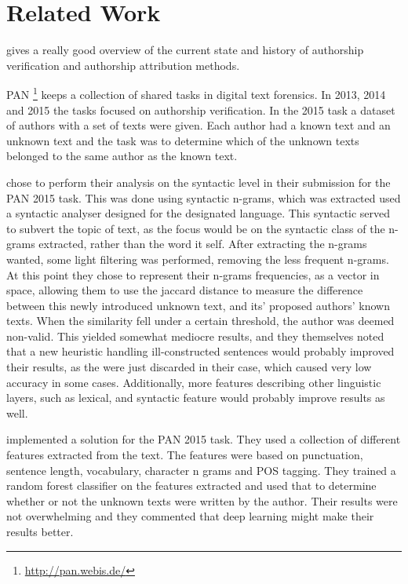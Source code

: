 \section{Related Work}
\cite{stamatos2009} gives a really good overview of the current state and
history of authorship verification and authorship attribution methods.

PAN \footnote{\url{http://pan.webis.de/}} keeps a collection of shared tasks in
digital text forensics. In 2013, 2014 and 2015 the tasks focused on authorship
verification. In the 2015 task a dataset of authors with a set of texts were
given. Each author had a known text and an unknown text and the task was to
determine which of the unknown texts belonged to the same author as the known
text.

\cite{juanpablo2015} chose to perform their analysis on the syntactic level in 
their submission for the PAN 2015 task. This was done using syntactic n-grams,
which was extracted used a syntactic analyser designed for the designated 
language. This syntactic served to subvert the topic of text, as the focus 
would be on the syntactic class of the n-grams extracted, rather than the word 
it self.
After extracting the n-grams wanted, some light filtering was performed, 
removing the less frequent n-grams. At this point they chose to represent their 
n-grams frequencies, as a vector in space, allowing them to use the jaccard 
distance to measure the difference between this newly introduced unknown text, 
and its' proposed authors' known texts. When the similarity fell under a 
certain threshold, the author was deemed non-valid.
This yielded somewhat mediocre results, and they themselves noted that a new 
heuristic handling ill-constructed sentences would probably improved their 
results, as the were just discarded in their case, which caused very low 
accuracy in some cases. Additionally, more features describing other linguistic 
layers, such as lexical, and syntactic feature would probably improve results 
as well.   

\cite{maitra2015} implemented a solution for the PAN 2015 task. They used a
collection of different features extracted from the text. The features were
based on punctuation, sentence length, vocabulary, character n grams and
\gls{POS} tagging. They trained a random forest classifier on the features
extracted and used that to determine whether or not the unknown texts were
written by the author. Their results were not overwhelming and they commented
that deep learning might make their results better.

